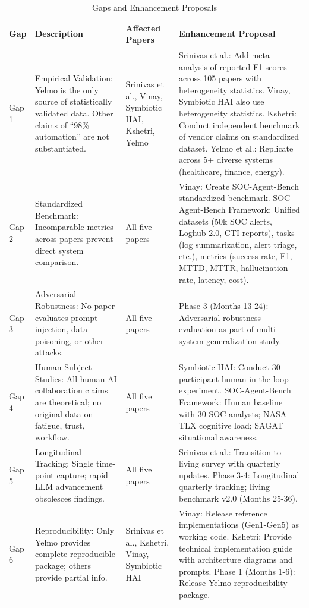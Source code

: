 \documentclass[journal]{IEEEtran}
\begin{document}
\begin{table}[!t]
\centering
\caption{Gaps and Enhancement Proposals}
\label{tab:gaps}
\begin{tabularx}{\textwidth}{|p{1.2cm}|p{3.5cm}|p{3.5cm}|X|}
\hline
\textbf{Gap} & \textbf{Description} & \textbf{Affected Papers} & \textbf{Enhancement Proposal} \\
\hline
Gap 1 & Empirical Validation: Yelmo is the only source of statistically validated data. Other claims of ``98\% automation'' are not substantiated. & Srinivas et al., Vinay, Symbiotic HAI, Kshetri, Yelmo & Srinivas et al.: Add meta-analysis of reported F1 scores across 105 papers with heterogeneity statistics. Vinay, Symbiotic HAI also use heterogeneity statistics. Kshetri: Conduct independent benchmark of vendor claims on standardized dataset. Yelmo et al.: Replicate across 5+ diverse systems (healthcare, finance, energy). \\
\hline
Gap 2 & Standardized Benchmark: Incomparable metrics across papers prevent direct system comparison. & All five papers & Vinay: Create SOC-Agent-Bench standardized benchmark. SOC-Agent-Bench Framework: Unified datasets (50k SOC alerts, Loghub-2.0, CTI reports), tasks (log summarization, alert triage, etc.), metrics (success rate, F1, MTTD, MTTR, hallucination rate, latency, cost). \\
\hline
Gap 3 & Adversarial Robustness: No paper evaluates prompt injection, data poisoning, or other attacks. & All five papers & Phase 3 (Months 13-24): Adversarial robustness evaluation as part of multi-system generalization study. \\
\hline
Gap 4 & Human Subject Studies: All human-AI collaboration claims are theoretical; no original data on fatigue, trust, workflow. & All five papers & Symbiotic HAI: Conduct 30-participant human-in-the-loop experiment. SOC-Agent-Bench Framework: Human baseline with 30 SOC analysts; NASA-TLX cognitive load; SAGAT situational awareness. \\
\hline
Gap 5 & Longitudinal Tracking: Single time-point capture; rapid LLM advancement obsolesces findings. & All five papers & Srinivas et al.: Transition to living survey with quarterly updates. Phase 3-4: Longitudinal quarterly tracking; living benchmark v2.0 (Months 25-36). \\
\hline
Gap 6 & Reproducibility: Only Yelmo provides complete reproducible package; others provide partial info. & Srinivas et al., Kshetri, Vinay, Symbiotic HAI & Vinay: Release reference implementations (Gen1-Gen5) as working code. Kshetri: Provide technical implementation guide with architecture diagrams and prompts. Phase 1 (Months 1-6): Release Yelmo reproducibility package. \\
\hline
\end{tabularx}
\end{table}
\end{document}
